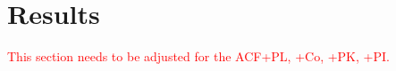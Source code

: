 \documentclass[12pt]{article}
\begin{document}


\section{Results}
\label{sec:}

\textcolor{red}{This section needs to be adjusted for the ACF+PL, +Co, +PK, +PI.}

 


\appendix
\end{document}
